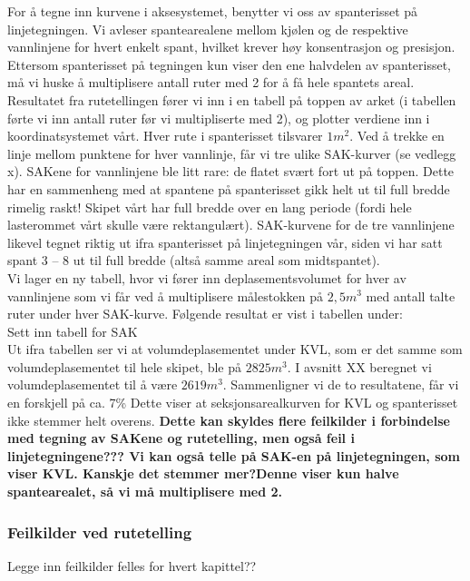 \documentclass[norsk]{article}
\begin{document}
For å tegne inn kurvene i aksesystemet, benytter vi oss av spanterisset på linjetegningen. Vi avleser spantearealene mellom kjølen og de respektive vannlinjene for hvert enkelt spant, hvilket krever høy konsentrasjon og presisjon. Ettersom spanterisset på tegningen kun viser den ene halvdelen av spanterisset, må vi huske å multiplisere antall ruter med 2 for å få hele spantets areal. Resultatet fra rutetellingen fører vi inn i en tabell på toppen av arket (i tabellen førte vi inn antall ruter før vi multipliserte med 2), og plotter verdiene inn i koordinatsystemet vårt. Hver rute i spanterisset tilsvarer $1m^2$. Ved å trekke en linje mellom punktene for hver vannlinje, får vi tre ulike SAK-kurver (se vedlegg x). SAKene for vannlinjene ble litt rare: de flatet svært fort ut på toppen. Dette har en sammenheng med at spantene på spanterisset gikk helt ut til full bredde rimelig raskt! Skipet vårt har full bredde over en lang periode (fordi hele lasterommet vårt skulle være rektangulært). SAK-kurvene for de tre vannlinjene likevel tegnet riktig ut ifra spanterisset på linjetegningen vår, siden vi har satt spant 3 – 8 ut til full bredde (altså samme areal som midtspantet).\\

Vi lager en ny tabell, hvor vi fører inn deplasementsvolumet for hver av vannlinjene som vi får ved å multiplisere målestokken på $2,5m^3$ med antall talte ruter under hver SAK-kurve. Følgende resultat er vist i tabellen under:\\

Sett inn tabell for SAK\\

Ut ifra tabellen ser vi at volumdeplasementet under KVL, som er det samme som volumdeplasementet til hele skipet, ble på $2825 m^3$. I avsnitt XX beregnet vi volumdeplasementet til å være $2619 m^3$. Sammenligner vi de to resultatene, får vi en forskjell på ca. 7\% Dette viser at seksjonsarealkurven for KVL og spanterisset ikke stemmer helt overens. \textbf{Dette kan skyldes flere feilkilder i forbindelse med tegning av SAKene og rutetelling, men også feil i linjetegningene??? Vi kan også telle på SAK-en på linjetegningen, som viser KVL. Kanskje det stemmer mer?Denne viser kun halve spantearealet, så vi må multiplisere med 2.}

		\subsubsection{Feilkilder ved rutetelling}
        Legge inn feilkilder felles for hvert kapittel??
\end{document}
